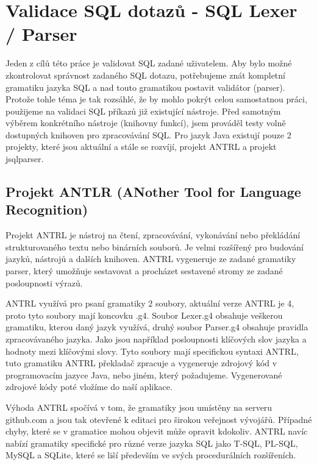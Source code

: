 \documentclass[czech,bachelor,public,dept460,male,cpdeclaration,twoside]{diploma}
\begin{document}
\newpage
\section{Validace SQL dotazů - SQL Lexer / Parser} \label{parsers}
Jeden z cílů této práce je validovat SQL zadané uživatelem. Aby bylo možné zkontrolovat správnost zadaného SQL dotazu, potřebujeme znát kompletní gramatiku jazyka SQL a nad touto gramatikou postavit validátor (parser). Protože tohle téma je tak rozsáhlé, že by mohlo pokrýt celou samostatnou práci, použijeme na validaci SQL příkazů již existující nástroje. Před samotným výběrem konkrétního nástroje (knihovny funkcí), jsem prováděl testy volně dostupných knihoven pro zpracovávání SQL. Pro jazyk Java existují pouze 2 projekty, které jsou aktuální a stále se rozvíjí, projekt ANTRL a projekt jsqlparser.


\subsection{Projekt ANTLR (ANother Tool for Language Recognition)} \label{antrlproject}
Projekt ANTRL je nástroj na čtení, zpracovávání, vykonávání nebo překládání strukturovaného textu nebo binárních souborů. Je velmi rozšířený pro budování jazyků, nástrojů a dalších knihoven. ANTRL vygeneruje ze zadané gramatiky parser, který umožňuje sestavovat a procházet sestavené stromy ze zadané posloupnosti výrazů. \cite{antrl}



ANTRL využívá pro psaní gramatiky 2 soubory, aktuální verze ANTRL je 4, proto tyto soubory mají koncovku .g4. Soubor Lexer.g4 obsahuje veškerou gramatiku, kterou daný jazyk využívá, druhý soubor Parser.g4 obsahuje pravidla zpracovávaného jazyka. Jako jsou například posloupnosti klíčových slov jazyka a hodnoty mezi klíčovými slovy. Tyto soubory mají specifickou syntaxi ANTRL, tuto gramatiku ANTRL překladač zpracuje a vygeneruje zdrojový kód v programovacím jazyce Java, nebo jiném, který požadujeme. Vygenerované zdrojové kódy poté vložíme do naší aplikace. \cite{antrldocs}



Výhoda ANTRL spočívá v tom, že gramatiky jsou umístěny na serveru github.com a jsou tak otevřené k editaci pro širokou veřejnost vývojářů. Případné chyby, které se v gramatice mohou objevit může opravit kdokoliv. ANTRL navíc nabízí gramatiky specifické pro různé verze jazyka SQL jako T-SQL, PL-SQL, MySQL a SQLite, které se liší především ve svých procedurálních rozšířeních. \cite{antrlg}
\end{document}
